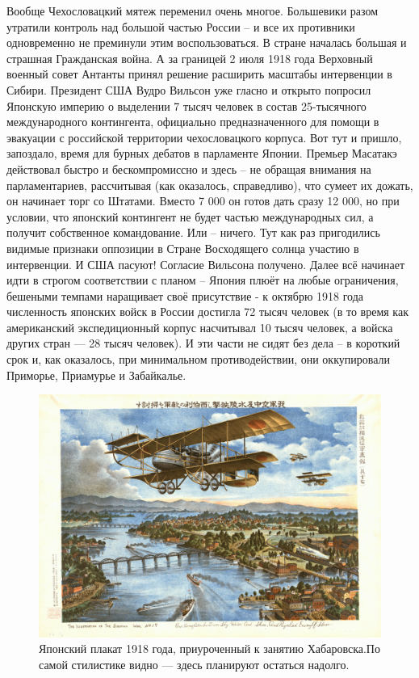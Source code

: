 Вообще Чехословацкий мятеж переменил очень многое. Большевики разом утратили контроль над большой частью России – и все их противники одновременно не преминули этим воспользоваться. В стране началась большая и страшная Гражданская война. А за границей 2 июля 1918 года Верховный военный совет Антанты принял решение расширить масштабы интервенции в Сибири. Президент США Вудро Вильсон уже гласно и открыто попросил Японскую империю о выделении 7 тысяч человек в состав 25-тысячного международного контингента, официально предназначенного для помощи в эвакуации с российской территории чехословацкого корпуса. Вот тут и пришло, запоздало, время для бурных дебатов в парламенте Японии. Премьер Масатакэ действовал быстро и бескомпромиссно и здесь – не обращая внимания на парламентариев, рассчитывая (как оказалось, справедливо), что сумеет их дожать, он начинает торг со Штатами. Вместо 7 000 он готов дать сразу 12 000, но при условии, что японский контингент не будет частью международных сил, а получит собственное командование. Или – ничего. Тут как раз пригодились видимые признаки оппозиции в Стране Восходящего солнца участию в интервенции. И США пасуют! Согласие Вильсона получено. Далее всё начинает идти в строгом соответствии с планом – Япония плюёт на любые ограничения, бешеными темпами наращивает своё присутствие - к октябрю 1918 года численность японских войск в России достигла 72 тысяч человек (в то время как американский экспедиционный корпус насчитывал 10 тысяч человек, а войска других стран — 28 тысяч человек). И эти части не сидят без дела – в короткий срок и, как оказалось, при минимальном противодействии, они оккупировали Приморье, Приамурье и Забайкалье. 

\begin{figure}[h!tb] 
	\centering\includegraphics[scale=0.2]{Glava5/lGSk4J5QeZg.jpg}
	\caption{Японский плакат 1918 года, приуроченный к занятию Хабаровска.По самой стилистике видно — здесь планируют остаться надолго.}%
\end{figure}

